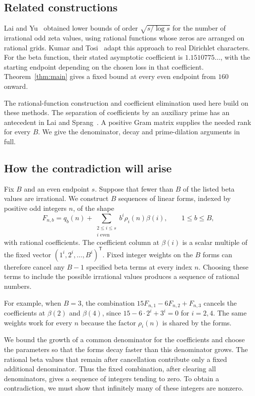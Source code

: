 \subsection{Related constructions}

Lai and Yu~\cite{LY20} obtained lower bounds of order
$\sqrt{s/\log s}$ for the number of irrational odd zeta values,
using rational functions whose zeros are arranged on rational grids.
Kumar and Tosi~\cite[Theorem~1]{KT26} adapt this approach to real
Dirichlet characters. For the beta function, their stated asymptotic
coefficient is $1.1510775\ldots$, with the starting endpoint depending
on the chosen loss in that coefficient. Theorem~\ref{thm:main} gives
a fixed bound at every even endpoint from $160$ onward.

The rational-function construction and coefficient elimination used
here build on these methods. The separation of coefficients by an
auxiliary prime has an antecedent in Lai and Sprang~\cite{LS25}.
A positive Gram matrix supplies the needed rank for every $B$. We give the
denominator, decay and prime-dilation arguments in full.

\subsection{How the contradiction will arise}

Fix $B$ and an even endpoint $s$. Suppose that fewer than $B$ of
the listed beta values are irrational. We construct $B$ sequences
of linear forms, indexed by positive odd integers $n$, of the shape
\begin{equation}\label{eq:preview}
 F_{n,b}=q_b(n)+\sum_{\substack{2\le i\le s\\i\text{ even}}}
                  b^i\rho_i(n)\beta(i),\qquad 1\le b\le B,
\end{equation}
with rational coefficients. The coefficient column at $\beta(i)$
is a scalar multiple of the fixed vector
$(1^i,2^i,\ldots,B^i)^{\mathsf T}$. Fixed integer weights on the
$B$ forms can therefore cancel any $B-1$ specified beta terms
at every index $n$. Choosing these terms to include the possible
irrational values produces a sequence of rational numbers.

For example, when $B=3$, the combination
$15F_{n,1}-6F_{n,2}+F_{n,3}$ cancels the coefficients at
$\beta(2)$ and $\beta(4)$, since
$15-6\cdot2^i+3^i=0$ for $i=2,4$. The same weights work for
every $n$ because the factor $\rho_i(n)$ is shared by the forms.

We bound the growth of a common denominator for the coefficients
and choose the parameters so that the forms decay faster than this
denominator grows. The rational beta values that remain after
cancellation contribute only a fixed additional denominator.
Thus the fixed combination, after clearing all denominators, gives
a sequence of integers tending to zero. To obtain a contradiction,
we must show that infinitely many of these integers are nonzero.

